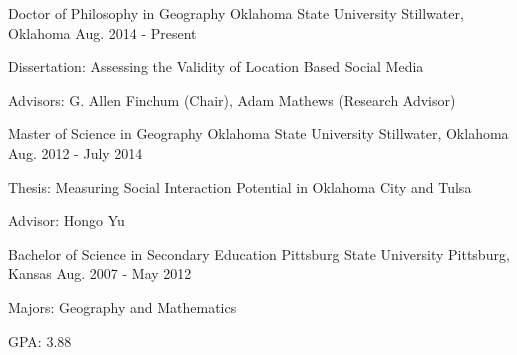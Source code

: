 

\begin{cventries}

  \cventry
    {Doctor of Philosophy in Geography} %
    {Oklahoma State University} %
    {Stillwater, Oklahoma} %
    {Aug. 2014 - Present} %
    {
      \begin{cvitems} %
        \item {Dissertation: Assessing the Validity of Location Based Social Media}
        \item {Advisors: G. Allen Finchum (Chair), Adam Mathews (Research Advisor)}
      \end{cvitems}
    }
  \cventry
    {Master of Science in Geography} %
    {Oklahoma State University} %
    {Stillwater, Oklahoma} %
    {Aug. 2012 - July 2014} %
    {
      \begin{cvitems} %
        \item {Thesis: Measuring Social Interaction Potential in Oklahoma City and Tulsa}
        \item {Advisor: Hongo Yu}
      \end{cvitems}
    }

  \cventry
    {Bachelor of Science in Secondary Education} %
    {Pittsburg State University} %
    {Pittsburg, Kansas} %
    {Aug. 2007 - May 2012} %
    {
      \begin{cvitems} %
        \item {Majors: Geography and Mathematics}
        \item {GPA: 3.88}
      \end{cvitems}
    }
\end{cventries}

